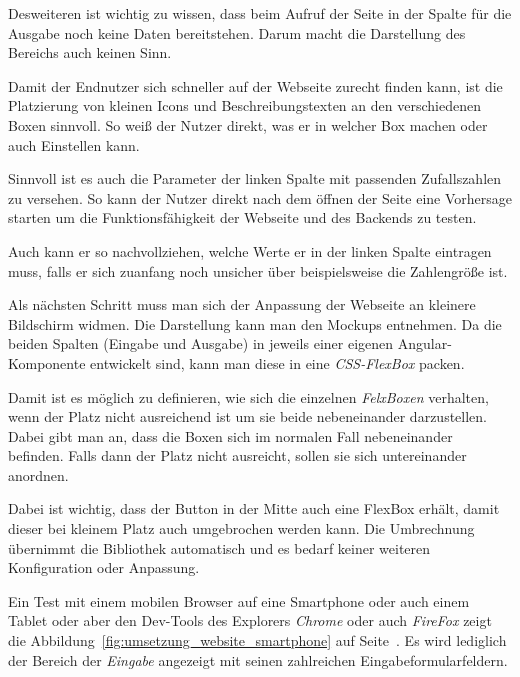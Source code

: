 Desweiteren ist wichtig zu wissen, dass beim Aufruf der Seite in der Spalte für die Ausgabe noch keine Daten
bereitstehen. Darum macht die Darstellung des Bereichs auch keinen Sinn.

Damit der Endnutzer sich schneller auf der Webseite zurecht finden kann, ist die Platzierung von kleinen Icons und
Beschreibungstexten an den verschiedenen Boxen sinnvoll. So weiß der Nutzer direkt, was er in welcher Box machen oder
auch Einstellen kann.

Sinnvoll ist es auch die Parameter der linken Spalte mit passenden Zufallszahlen zu versehen. So kann der Nutzer direkt
nach dem öffnen der Seite eine Vorhersage starten um die Funktionsfähigkeit der Webseite und des Backends zu testen.

Auch kann er so nachvollziehen, welche Werte er in der linken Spalte eintragen muss, falls er sich zuanfang noch
unsicher über beispielsweise die Zahlengröße ist.

Als nächsten Schritt muss man sich der Anpassung der Webseite an kleinere Bildschirm widmen. Die Darstellung kann man
den Mockups entnehmen. Da die beiden Spalten (Eingabe und Ausgabe) in jeweils einer eigenen Angular-Komponente
entwickelt sind, kann man diese in eine \textit{CSS-FlexBox} packen.

Damit ist es möglich zu definieren, wie sich die einzelnen \textit{FelxBoxen} verhalten, wenn der Platz nicht
ausreichend ist um sie beide nebeneinander darzustellen. Dabei gibt man an, dass die Boxen sich im normalen Fall
nebeneinander befinden. Falls dann der Platz nicht ausreicht, sollen sie sich untereinander anordnen.

Dabei ist wichtig, dass der Button in der Mitte auch eine FlexBox erhält, damit dieser bei kleinem Platz auch
umgebrochen werden kann. Die Umbrechnung übernimmt die Bibliothek automatisch und es bedarf keiner weiteren
Konfiguration oder Anpassung.

Ein Test mit einem mobilen Browser auf eine Smartphone oder auch einem Tablet oder aber den Dev-Tools des Explorers
\textit{Chrome} oder auch \textit{FireFox} zeigt die Abbildung~\ref{fig:umsetzung_website_smartphone} auf
Seite~\pageref{fig:umsetzung_website_smartphone}. Es wird lediglich der Bereich der \textit{Eingabe} angezeigt mit
seinen zahlreichen Eingabeformularfeldern.


